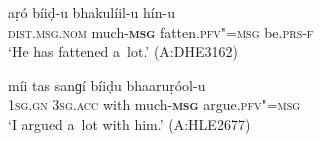 \begin{exe}
\ex
\label{ex:10-76}
\gll aṛó bíiḍ-u bhakulíil-u hín-u \\
 \textsc{dist.msg.nom} much-\textbf{\textsc{msg}} fatten.\textsc{pfv"=msg} be.\textsc{prs-f} \\
\glt `He has fattened a~lot.' (A:DHE3162)

\ex
\label{ex:10-77}
\gll míi tas sanɡí bíiḍu bhaaruṛóol-u \\
\textsc{1sg.gn} \textsc{3sg.acc} with much-\textbf{\textsc{msg}} argue.\textsc{pfv"=msg}  \\
\glt `I argued a~lot with him.' (A:HLE2677)
\end{exe}
